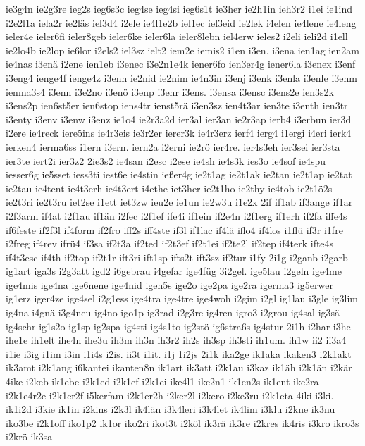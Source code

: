 {ie3g4n
ie2g3re
ieg2s
ieg6s3c
ieg4se
ieg4si
ieg6s1t
ie3her
ie2h1in
ieh3r2
i1ei
ie1ind
i2e2l1a
iela2r
ie2läs
iel3d4
i2ele
ie4l1e2b
iel1ec
iel3eid
ie2lek
i4elen
ie4lene
ie4leng
ieler4e
ieler6fi
ieler8geb
ieler6ke
ieler6la
ieler8lebn
iel4erw
ieles2
i2eli
ieli2d
i1ell
ie2lo4b
ie2lop
ie6lor
i2els2
iel3sz
ielt2
iem2e
iemis2
i1en
i3en.
i3ena
ien1ag
ien2am
ie4nas
i3enä
i2ene
ien1eb
i3enec
i3e2n1e4k
iener6fo
ien3er4g
iener6la
i3enex
i3enf
i3eng4
ienge4f
ienge4z
i3enh
ie2nid
ie2nim
ie4n3in
i3enj
i3enk
i3enla
i3enle
i3enm
ienma3s4
i3enn
i3e2no
i3enö
i3enp
i3enr
i3ens.
i3ensa
i3ensc
i3ens2e
ien3s2k
i3ens2p
ien6st5er
ien6stop
iens4tr
ienst5rä
i3en3sz
ien4t3ar
ien3te
i3enth
ien3tr
i3enty
i3env
i3enw
i3enz
ie1o4
ie2r3a2d
ier3al
ier3an
ie2r3ap
ierb4
i3erbun
ier3d
i2ere
ie4reck
iere5ins
ie4r3eis
ie3r2er
ierer3k
ie4r3erz
ierf4
ierg4
i1ergi
i4eri
ierk4
ierken4
ierma6ss
i1ern
i3ern.
iern2a
i2erni
ie2rö
ier4re.
ier4s3eh
ier3sei
ier3sta
ier3te
iert2i
ier3z2
2ie3s2
ie4san
i2esc
i2ese
ie4sh
ie4s3k
ies3o
ie4sof
ie4spu
iesser6g
ie5sset
iess3ti
iest6e
ie4stin
ießer4g
ie2t1ag
ie2t1ak
ie2tan
ie2t1ap
ie2tat
ie2tau
ie4tent
ie4t3erh
ie4t3ert
i4ethe
iet3her
ie2t1ho
ie2thy
ie4tob
ie2t1ö2s
ie2t3ri
ie2t3ru
iet2se
i1ett
iet3zw
ieu2e
ie1un
ie2w3u
i1e2x
2if
if1ab
if3ange
if1ar
i2f3arm
if4at
i2f1au
if1än
i2fec
i2f1ef
ife4i
if1ein
if2e4n
i2f1erg
if1erh
if2fa
iffe4s
if6feste
if2f3l
if4form
if2fro
iff2s
iff4ste
if3l
if1lac
if4lä
iflo4
if4los
i1flü
if3r
i1fre
i2freg
if4rev
ifrü4
if3sa
if2t3a
if2ted
if2t3ef
if2t1ei
if2te2l
if2tep
if4terk
ifte4s
if4t3esc
if4th
if2top
if2t1r
ift3ri
ift1sp
ifts2t
ift3sz
if2tur
i1fy
2i1g
i2ganb
i2garb
ig1art
iga3s
i2g3att
igd2
i6gebrau
i4gefar
ige4füg
3i2gel.
ige5lau
i2geln
ige4me
ige4mis
ige4na
ige6nene
ige4nid
igen5s
ige2o
ige2pa
ige2ra
igerma3
ig5erwer
ig1erz
iger4ze
ige4sel
i2g1ess
ige4tra
ige4tre
ige4woh
i2gim
i2gl
ig1lau
i3gle
ig3lim
ig4na
i4gnä
i3g4neu
ig4no
igo1p
ig3rad
i2g3re
ig4ren
igro3
i2grou
ig4sal
ig3sä
ig4schr
ig1s2o
ig1sp
ig2spa
ig4sti
ig4s1to
ig2stö
ig6stra6s
ig4stur
2i1h
i2har
i3he
ihe1e
ih1elt
ihe4n
ihe3u
ih3m
ih3n
ih3r2
ih2s
ih3sp
ih3sti
ih1um.
ih1w
ii2
ii3a4
i1ie
i3ig
i1im
i3in
i1i4s
i2is.
ii3t
i1it.
i1j
1i2js
2i1k
ika2ge
ik1aka
ikaken3
i2k1akt
ik3amt
i2k1ang
i6kantei
ikanten8n
ik1art
ik3att
i2k1au
i3kaz
ik1äh
i2k1än
i2kär
4ike
i2keb
ik1ebe
i2k1ed
i2k1ef
i2k1ei
ike4l1
ike2n1
ik1en2s
ik1ent
ike2ra
i2k1e4r2e
i2k1er2f
i5kerfam
i2k1er2h
i2ker2l
i2kero
i2ke3ru
i2k1eta
4iki
i3ki.
ik1i2d
i3kie
ik1in
i2kins
i2k3l
ik4län
i3k4leri
i3k4let
ik4lim
i3klu
i2kne
ik3nu
iko3be
i2k1off
iko1p2
ik1or
iko2ri
ikot3t
i2köl
ik3rä
ik3re
i2kres
ik4ris
i3kro
ikro3s
i2krö
ik3sa
}
